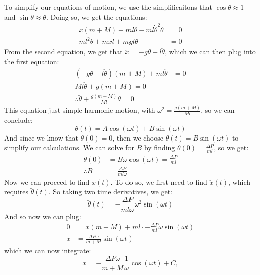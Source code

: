 \documentclass[10pt]{article}
\begin{document}
\begin{enumerate}[label=(\alph*)]
            \begin{solution}
                To simplify our equations of motion, we use the simplificaitons that $\cos \theta \approx 1$ and $\sin \theta \approx \theta$. Doing so, we get the equations: 
                \begin{align*}
                    \ddot x (m + M) + ml \ddot \theta - ml \dot \theta^2 \theta &= 0\\
                    ml^2 \ddot \theta + m \ddot x l + mgl \theta &= 0
                \end{align*}
                From the second equation, we get that $\ddot x = -g\theta - l \ddot \theta$, which we can then plug into the first equation: 
                \begin{align*}
                    (-g\theta - l\ddot \theta)(m + M) + ml\ddot \theta &= 0\\
                    Ml\ddot \theta + g(m+M) = 0\\
                    \therefore \ddot \theta + \frac{g(m+M)}{Ml}\theta = 0
                \end{align*}
                This equation just simple harmonic motion, with $\omega^2 = \frac{g(m+M)}{Ml}$, so we can conclude:
                \[ \theta(t) = A \cos (\omega t) + B\sin(\omega t)\] 
                And since we know that $\theta(0) = 0$, then we choose $\theta(t) = B\sin(\omega t)$ to simplify our calculations. We can solve for $B$ by finding $\dot \theta(0) = \frac{\Delta P}{ml}$, so we get:
                \begin{align*}
                    \dot \theta(0) &= B\omega\cos(\omega t) = \frac{\Delta P}{ml}\\
                    \therefore B &= \frac{\Delta P}{ml\omega}
                \end{align*}
                Now we can proceed to find $x(t)$. To do so, we first need to find $\ddot x(t)$, which requires $\ddot \theta(t)$. So taking two time derivatives, we get:
                \[ \ddot \theta(t) = -\frac{\Delta P}{ml\omega} \omega^2 \sin(\omega t) \] 
                And so now we can plug: 
                \begin{align*}
                    0 &= \ddot x(m+ M) + ml\cdot -\frac{\Delta P}{ml}\omega \sin (\omega t)\\
                    \ddot x &= \frac{\Delta P \omega}{m +M} \sin (\omega t)
                \end{align*}
                which we can now integrate: 
                \[ \dot x = -\frac{\Delta P \omega}{m +M} \frac 1\omega \cos(\omega t) + C_1\] 

\end{solution}
\end{enumerate}
\end{document}
